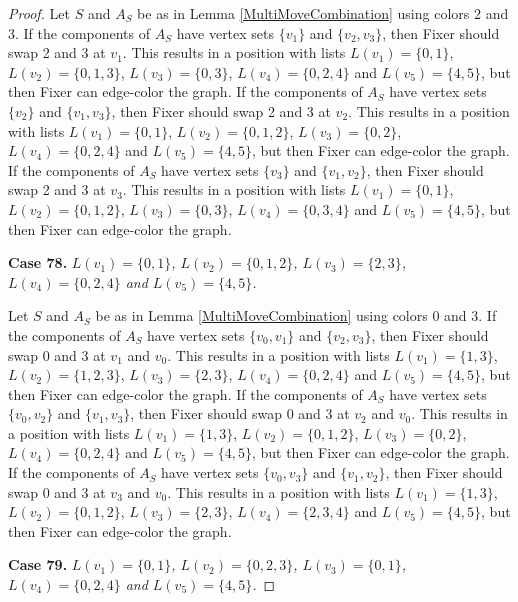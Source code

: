 \documentclass[12pt]{amsart}
\theoremstyle{plain}
\theoremstyle{definition}
\theoremstyle{remark}
\begin{document}
\begin{proof}
Let $S$ and $A_S$ be as in Lemma \ref{MultiMoveCombination} using colors $2$ and $3$. If the components of $A_S$ have vertex sets $\{v_1\}$ and $\{v_2, v_3\}$, then Fixer should swap 2 and 3 at $v_1$. This results in a position with lists $L(v_1) = \{0, 1\}$, $L(v_2) = \{0, 1, 3\}$, $L(v_3) = \{0, 3\}$, $L(v_4) = \{0, 2, 4\}$ and $L(v_5) = \{4, 5\}$, but then Fixer can edge-color the graph.
If the components of $A_S$ have vertex sets $\{v_2\}$ and $\{v_1, v_3\}$, then Fixer should swap 2 and 3 at $v_2$. This results in a position with lists $L(v_1) = \{0, 1\}$, $L(v_2) = \{0, 1, 2\}$, $L(v_3) = \{0, 2\}$, $L(v_4) = \{0, 2, 4\}$ and $L(v_5) = \{4, 5\}$, but then Fixer can edge-color the graph.
If the components of $A_S$ have vertex sets $\{v_3\}$ and $\{v_1, v_2\}$, then Fixer should swap 2 and 3 at $v_3$. This results in a position with lists $L(v_1) = \{0, 1\}$, $L(v_2) = \{0, 1, 2\}$, $L(v_3) = \{0, 3\}$, $L(v_4) = \{0, 3, 4\}$ and $L(v_5) = \{4, 5\}$, but then Fixer can edge-color the graph.

\noindent\textbf{Case 78.  }\textit{$L(v_1) = \{0, 1\}$, $L(v_2) = \{0, 1, 2\}$, $L(v_3) = \{2, 3\}$, $L(v_4) = \{0, 2, 4\}$ and $L(v_5) = \{4, 5\}$.}

Let $S$ and $A_S$ be as in Lemma \ref{MultiMoveCombination} using colors $0$ and $3$. If the components of $A_S$ have vertex sets $\{v_0, v_1\}$ and $\{v_2, v_3\}$, then Fixer should swap 0 and 3 at $v_1$ and $v_0$. This results in a position with lists $L(v_1) = \{1, 3\}$, $L(v_2) = \{1, 2, 3\}$, $L(v_3) = \{2, 3\}$, $L(v_4) = \{0, 2, 4\}$ and $L(v_5) = \{4, 5\}$, but then Fixer can edge-color the graph.
If the components of $A_S$ have vertex sets $\{v_0, v_2\}$ and $\{v_1, v_3\}$, then Fixer should swap 0 and 3 at $v_2$ and $v_0$. This results in a position with lists $L(v_1) = \{1, 3\}$, $L(v_2) = \{0, 1, 2\}$, $L(v_3) = \{0, 2\}$, $L(v_4) = \{0, 2, 4\}$ and $L(v_5) = \{4, 5\}$, but then Fixer can edge-color the graph.
If the components of $A_S$ have vertex sets $\{v_0, v_3\}$ and $\{v_1, v_2\}$, then Fixer should swap 0 and 3 at $v_3$ and $v_0$. This results in a position with lists $L(v_1) = \{1, 3\}$, $L(v_2) = \{0, 1, 2\}$, $L(v_3) = \{2, 3\}$, $L(v_4) = \{2, 3, 4\}$ and $L(v_5) = \{4, 5\}$, but then Fixer can edge-color the graph.

\noindent\textbf{Case 79.  }\textit{$L(v_1) = \{0, 1\}$, $L(v_2) = \{0, 2, 3\}$, $L(v_3) = \{0, 1\}$, $L(v_4) = \{0, 2, 4\}$ and $L(v_5) = \{4, 5\}$.}


\end{proof}
\end{document}
